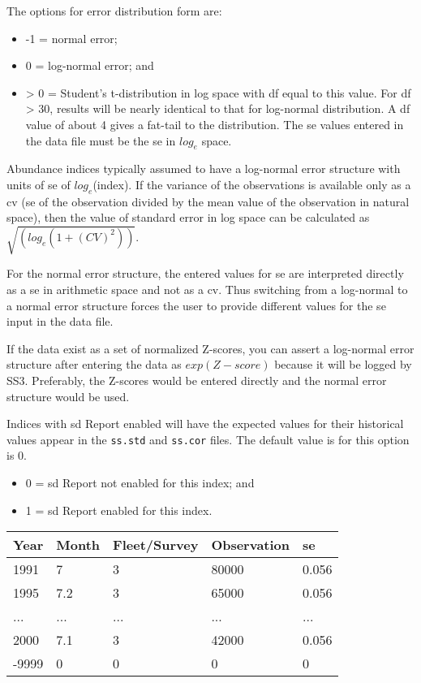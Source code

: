 The options for error distribution form are:
\begin{itemize}
	\item -1 = normal error;
	\item  0 = log-normal error; and 
	\item > 0 = Student's t-distribution in log space with \gls{df} equal to this value. For \gls{df} > 30, results will be nearly identical to that for log-normal distribution. A \gls{df} value of about 4 gives a fat-tail to the distribution. The \gls{se} values entered in the data file must be the \gls{se} in $log_{e}$ space.
\end{itemize}

Abundance indices typically assumed to have a log-normal error structure with units of \gls{se} of $log_{e}$(index). If the variance of the observations is available only as a \gls{cv} (\gls{se} of the observation divided by the mean value of the observation in natural space), then the value of standard error in log space can be calculated as $\sqrt{(log_e(1+(CV)^2))}$.

For the normal error structure, the entered values for \gls{se} are interpreted directly as a \gls{se} in arithmetic space and not as a \gls{cv}. Thus switching from a log-normal to a normal error structure forces the user to provide different values for the \gls{se} input in the data file.

If the data exist as a set of normalized Z-scores, you can assert a log-normal error structure after entering the data as $exp(Z-score)$ because it will be logged by SS3. Preferably, the Z-scores would be entered directly and the normal error structure would be used.

Indices with \gls{sd} Report enabled will have the expected values for their historical values appear in the \texttt{ss.std} and \texttt{ss.cor} files. The default value is for this option is 0.

\begin{itemize}
	\item 0 = \gls{sd} Report not enabled for this index; and
	\item 1 = \gls{sd} Report enabled for this index.
\end{itemize}


\begin{center}
	\begin{tabular}{p{3cm} p{2cm} p{3cm} p{3cm} p{2.5cm}}
		\hline
		Year & Month & Fleet/Survey & Observation & \gls{se} \Tstrut\Bstrut\\
		\hline
		1991 & 7   & 3   & 80000 & 0.056 \Tstrut\\
		1995 & 7.2 & 3   & 65000 & 0.056 \\
		...  & ... & ... & ...   & ... \\
		2000 & 7.1 & 3   & 42000 & 0.056 \\
		-9999 & 0  & 0   & 0     & 0 \Bstrut\\ 
		\hline
	\end{tabular}
\end{center}

